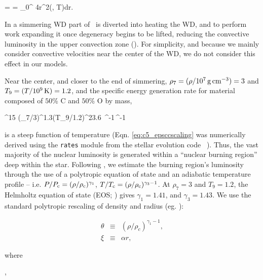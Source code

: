 \eqbegin
\Lconv = \Lcc = \int_0^{\Rwd} 4\pi r^2\rho \epscc(\rho, T)dr.
\label{eq:c5_convlum}
\eqend

\noindent In a simmering WD part of \Lcc\ is diverted into heating the WD, and to perform work expanding it once degeneracy begins to be lifted, reducing the convective luminosity in the upper convection zone (\citeal{piroc08}).  For simplicity, and because we mainly consider convective velocities near the center of the WD, we do not consider this effect in our models.  

Near the center, and closer to the end of simmering, $\rho_7 = (\rho/10^7\,\gcc) = 3$ and $T_9 = (T/10^9\,\mathrm{K}) = 1.2$, and the specific energy generation rate {\charles for material composed of $50$\% C and $50$\% O by mass,}

\eqbegin
\epscc {}^{15} \left(\rho_7/3\right)^{1.3}\left(T_9/1.2\right)^{23.6}\,\,\,^{-1}\,^{-1}
\label{eq:c5_epsccscaling}
\eqend

\noindent is a steep function of temperature (Eqn. \ref{eq:c5_epsccscaling} was numerically derived using the \texttt{rates} module from the stellar evolution code \mesa\ \citep{paxt+11}).  Thus, the vast majority of the nuclear luminosity is generated within a ``nuclear burning region'' deep within the star.  Following \citeal{wooswk04}, we estimate the burning region's luminosity through the use of a polytropic equation of state and an adiabatic temperature profile -- i.e. $P/P_\mrm{c} = (\rho/\rhoc)^{\gamma_1}$, $T/\Tc = (\rho/\rhoc)^{\gamma_3-1}$.  At $\rho_7 = 3$ and $T_9 = 1.2$, the Helmholtz equation of state (EOS; \citealt{timms00}) gives $\gamma_1 = 1.41$, and $\gamma_3 = 1.43$.  We use the standard polytropic rescaling of density and radius (eg. \citealt{kippww12}): 

\begin{eqnarray}
\theta &\equiv& (\rho/\rho_c)^{\gamma_1 - 1}, \nonumber \\
\xi &\equiv& \alpha r,
\label{eq:c5_poly_def}
\end{eqnarray}

\noindent where

\eqbegin
\alpha \equiv {},
\label{eq:c5_poly_alpha}
\eqend


